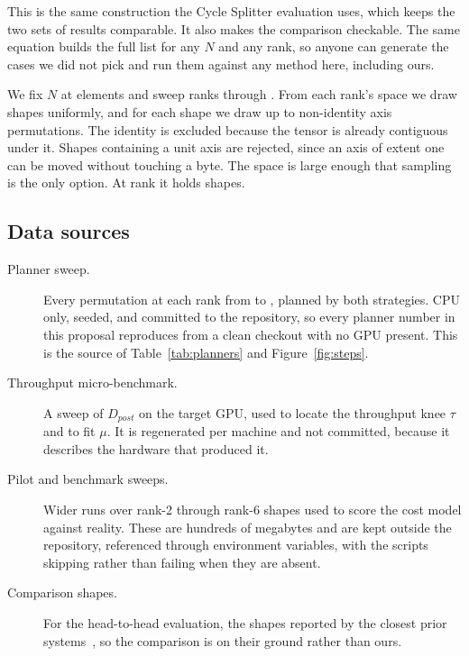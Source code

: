 This is the same construction the Cycle Splitter evaluation uses, which keeps
the two sets of results comparable. It also makes the comparison checkable.
The same equation builds the full list for any $N$ and any rank, so anyone can
generate the cases we did not pick and run them against any method here,
including ours.

We fix $N$ at \planElements{} elements and sweep ranks \planRankLo{} through
\planRankHi{}. From each rank's space we draw \planShapesPerRank{} shapes
uniformly, and for each shape we draw up to \planPermsPerShape{} non-identity
axis permutations. The identity is excluded because the tensor is already
contiguous under it. Shapes containing a unit axis are rejected, since an axis
of extent one can be moved without touching a byte. The space is large enough
that sampling is the only option. At rank \planRankHi{} it holds
\planSpaceTop{} shapes.

\subsection{Data sources}

\begin{description}
\item[Planner sweep.] Every permutation at each rank from \planRankLo{} to
  \planRankHi{}, planned by both strategies. CPU only, seeded, and committed
  to the repository, so every planner number in this proposal reproduces from
  a clean checkout with no GPU present. This is the source of
  Table~\ref{tab:planners} and Figure~\ref{fig:steps}.
\item[Throughput micro-benchmark.] A sweep of $D_{post}$ on the target GPU,
  used to locate the throughput knee $\tau$ and to fit $\mu$. It is
  regenerated per machine and not committed, because it describes the hardware
  that produced it.
\item[Pilot and benchmark sweeps.] Wider runs over rank-2 through rank-6
  shapes used to score the cost model against reality. These are hundreds of
  megabytes and are kept outside the repository, referenced through
  environment variables, with the scripts skipping rather than failing when
  they are absent.
\item[Comparison shapes.] For the head-to-head evaluation, the shapes reported
  by the closest prior systems~\cite{wu2025eithot,cheng2025ittpd}, so the
  comparison is on their ground rather than ours.
\end{description}

